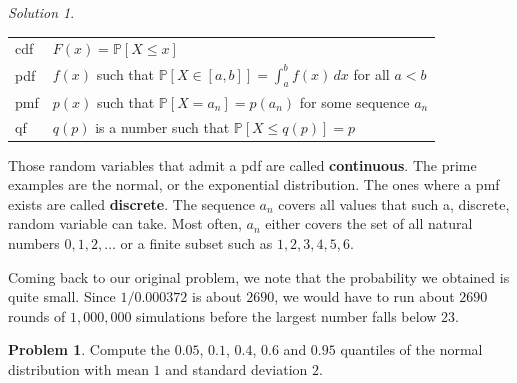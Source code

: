 \documentclass[
]{book}
\theoremstyle{definition}
\theoremstyle{definition}
\theoremstyle{definition}
\newtheorem{exercise}{Problem}[chapter]
\theoremstyle{definition}
\theoremstyle{remark}
\newtheorem*{solution}{Solution}
\begin{document}
\begin{solution}
\begin{longtable}[]{@{}
  >{\raggedright\arraybackslash}p{}
  >{\raggedright\arraybackslash}p{}@{}}
\toprule
& \\
\midrule
\endhead
cdf & \(F(x) = {\mathbb{P}}[X\leq x]\) \\
pdf & \(f(x)\) such that \({\mathbb{P}}[X \in [a,b]] = \int_a^b f(x) \, dx\) for all \(a<b\) \\
pmf & \(p(x)\) such that \({\mathbb{P}}[X=a_n] = p(a_n)\) for some sequence \(a_n\) \\
qf & \(q(p)\) is a number such that \({\mathbb{P}}[ X \leq q(p)] = p\) \\
\bottomrule
\end{longtable}

Those random variables that admit a pdf are called \textbf{continuous}. The prime
examples are the normal, or the exponential distribution. The ones where a pmf
exists are called \textbf{discrete}. The sequence \(a_n\) covers all values that such
a, discrete, random variable can take. Most often, \(a_n\) either covers the set
of all natural numbers \(0,1,2,\dots\) or a finite subset such as \(1,2,3,4,5,6\).

Coming back to our original problem, we note that the probability we obtained is
quite small. Since \(1/0.000372\) is about \(2690\), we would have to run about
\(2690\) rounds of \(1,000,000\) simulations before the largest number falls below
\(23\).
\end{solution}

\begin{exercise}
Compute the \(0.05\), \(0.1\), \(0.4\), \(0.6\) and \(0.95\) quantiles of the normal
distribution with mean \(1\) and standard deviation \(2\).
\end{exercise}
\end{document}
